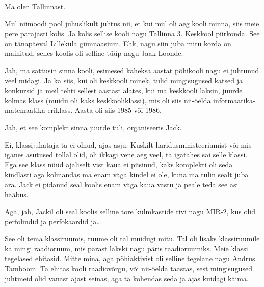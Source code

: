 
Ma olen Tallinnast.
                 

Mul niimoodi pool juhuslikult juhtus nii, et kui mul oli aeg kooli minna, siis 
meie pere parajasti kolis. Ja kolis sellise kooli nagu Tallinna 3. 
Keskkool piirkonda. See on tänapäeval 
Lilleküla gümnaasium. Ehk, nagu siin juba mitu korda on mainitud, selles koolis oli 
selline tüüp nagu Jaak Loonde.
                 

Jah, ma sattusin sinna kooli, esimesed kaheksa aastat põhikooli nagu ei 
juhtunud veel midagi. Ja ka siis, kui oli keskkooli minek, tulid mingisugused 
katsed ja konkursid ja meil tehti sellest aastast alates, kui ma keskkooli 
läksin, juurde kolmas klass (muidu oli kaks keskkooliklassi), mis oli siis 
nii-öelda informaatika-matemaatika eriklass. Aasta oli siis 1985 või 1986.


Jah, et see komplekt sinna juurde tuli, organiseeris Jack.


Ei, klassijuhataja ta ei olnud, ajas asju. Kuskilt haridusministeeriumist või 
mis iganes asutused tollal olid, oli ikkagi vene aeg veel, ta igatahes sai 
selle klassi. Ega see klass nüüd ajaliselt vist kaua ei püsinud,  kaks 
komplekti oli seda kindlasti aga kolmandas ma enam väga kindel ei ole, kuna ma 
tulin sealt juba ära. Jack ei pidanud seal koolis enam väga kaua vastu ja peale 
teda see asi hääbus. 

Aga, jah, Jackil oli seal koolis selline tore külmkastide rivi nagu 
MIR-2, kus olid perfolindid ja perfokaardid ja\ldots


See oli tema klassiruumis, ruume oli tal muidugi mitu. Tal oli lisaks 
klassiruumile ka mingi raadioruum, mis pärast läkski nagu päris raadioruumiks. 
Meie klassi tegelased ehitasid. Mitte mina, aga põhiaktivist oli selline 
tegelane nagu Andrus Tamboom. Ta ehitas kooli 
raadiovõrgu, või nii-öelda taastas, sest mingisugused juhtmeid olid vanast 
ajast  seinas, aga ta kohendas seda ja ajas kuidagi käima.

